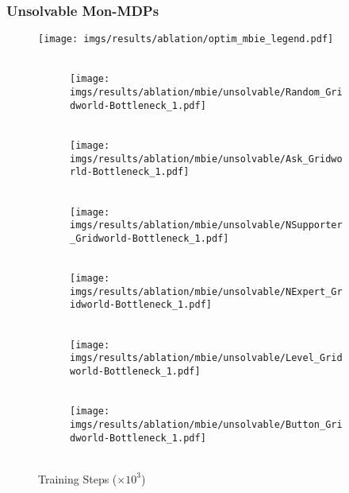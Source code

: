 \subsubsection{Unsolvable Mon-MDPs}
%
%
%
\begin{figure}[bth]
    \centering
    \texttt{[image: imgs/results/ablation/optim\_mbie\_legend.pdf]}
    \\[3pt]
    \hfill
    \begin{subfigure}[b]{0.155\linewidth}
        \centering
        \\
        \texttt{[image: imgs/results/ablation/mbie/unsolvable/Random\_Gridworld-Bottleneck\_1.pdf]}
    \end{subfigure} 
    \hfill
        \begin{subfigure}[b]{0.155\linewidth}
        \centering
        \\
        \texttt{[image: imgs/results/ablation/mbie/unsolvable/Ask\_Gridworld-Bottleneck\_1.pdf]}
    \end{subfigure} 
    \hfill
        \begin{subfigure}[b]{0.155\textwidth}
        \centering
        \\
        \texttt{[image: imgs/results/ablation/mbie/unsolvable/NSupporter\_Gridworld-Bottleneck\_1.pdf]}
    \end{subfigure} 
    \hfill
    \begin{subfigure}[b]{0.155\textwidth}
        \centering
        \\
        \texttt{[image: imgs/results/ablation/mbie/unsolvable/NExpert\_Gridworld-Bottleneck\_1.pdf]}
    \end{subfigure} 
    \hfill
    \begin{subfigure}[b]{0.155\textwidth}
        \centering
        \\
        \texttt{[image: imgs/results/ablation/mbie/unsolvable/Level\_Gridworld-Bottleneck\_1.pdf]}
    \end{subfigure} 
    \hfill
    \begin{subfigure}[b]{0.155\textwidth}
        \centering
        \\[-1.5pt]
        \texttt{[image: imgs/results/ablation/mbie/unsolvable/Button\_Gridworld-Bottleneck\_1.pdf]}
    \end{subfigure}
    \\[-1.5pt]
    {\scriptsize{Training Steps ($\times 10^3$)}}
    \label{fig:result_new_env}
    \vspace{-15pt}
\end{figure}
%
%
%

